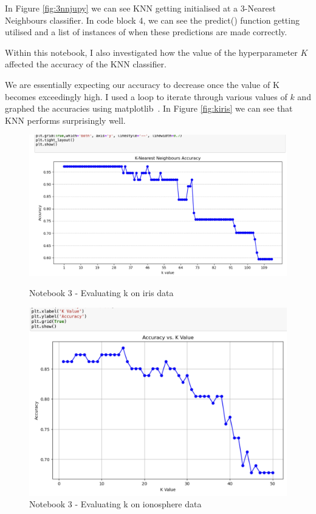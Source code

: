 \documentclass[letterpaper,10pt]{article}
\begin{document}
In Figure \ref{fig:3nnjupy} we can see KNN getting initialised at a 3-Nearest Neighbours classifier. In code block 4, we can see the predict() function getting utilised and a list of instances of when these predictions are made correctly. \par
Within this notebook, I also investigated how the value of the hyperparameter \(K\) affected the accuracy of the KNN classifier.\par
We are essentially expecting our accuracy to decrease once the value of K becomes exceedingly high. I used a loop to iterate through various values of \(k\) and graphed the accuracies using matplotlib~\cite{matplotlib}. In Figure \ref{fig:kiris} we can see that KNN performs surprisingly well. \par
\begin{figure}[ht]
    \centering
    \begin{minipage}{0.45\textwidth}
        \centering
        \includegraphics[width=\textwidth]{kiris.png}
        \caption{Notebook 3 - Evaluating k on iris data}
        \label{fig:kiris}
    \end{minipage}\hfill
    \begin{minipage}{0.45\textwidth}
        \centering
        \includegraphics[width=\textwidth]{kiono.png}
        \caption{Notebook 3 - Evaluating k on ionosphere data}
        \label{fig:kiono}
    \end{minipage}
\end{figure}
\end{document}
